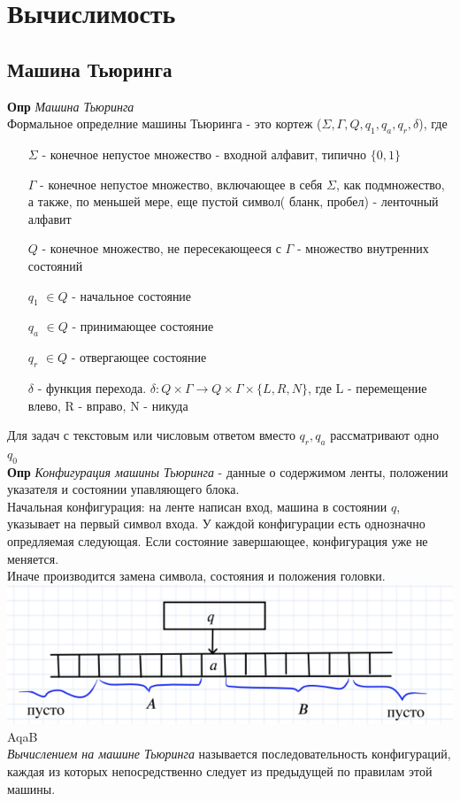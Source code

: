 \section{Вычислимость}

\subsection{Машина Тьюринга}

\textbf{Опр} \textit{Машина Тьюринга}\\ Формальное определние машины Тьюринга - это кортеж ($\Sigma, \Gamma, Q, q_1, q_a, q_r, \delta$), где
\begin{itemize}
    \item [$\Sigma$]
    - конечное непустое множество  - входной алфавит, типично $\{0,1\}$
\item[$\Gamma$] - конечное непустое множество, включающее в себя $\Sigma$, как подмножество, а также, по меньшей мере, еще пустой символ( бланк, пробел) - ленточный алфавит
\item[$Q$] - конечное множество, не пересекающееся с $\Gamma$ - множество внутренних состояний
\item[$q_1$]$\in Q$ - начальное состояние \item[$q_a$]$\in Q$ - принимающее состояние
\item[$q_r$]$\in Q$ - отвергающее состояние
\item[$\delta$] - функция перехода. $\delta: Q\times\Gamma \rightarrow Q\times\Gamma \times\{L, R, N\}$, где L - перемещение влево, R - вправо, N - никуда
\end{itemize}
Для задач с текстовым или числовым ответом вместо $q_r, q_a$ рассматривают одно $q_0$\\
\textbf{Опр} \textit{Конфигурация машины Тьюринга} - данные о содержимом ленты, положении указателя и состоянии упавляющего блока.\\ Начальная конфигурация: на ленте написан вход, машина в состоянии $q$, указывает на первый символ входа. У каждой конфигурации есть однозначно опредляемая следующая. Если состояние завершающее, конфигурация уже не меняется.\\ Иначе производится замена символа, состояния и положения головки.\\
\includegraphics{images/3 (определения)_m31.PNG} AqaB \\ \textit{Вычислением на машине Тьюринга} называется последовательность конфигураций, каждая из которых непосредственно следует из предыдущей по правилам этой машины.\\ \\
